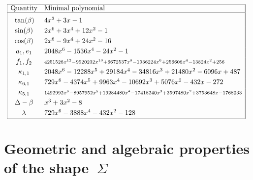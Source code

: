 \documentclass[11pt]{article}
\begin{document}
\begin{table}
$$
\!\!\!
\begin{array}{|cl|}
\hline
\textrm{Quantity} & \textrm{Minimal polynomial} \\
\hline
\vphantom{1^{1^{1^{1^1}}}}
\tan(\beta) & 4x^3+3x-1
\\[3pt]
\sin(\beta) & 2 x^6+3 x^4+12 x^2-1
\\[3pt]
\cos(\beta) & 2 x^6-9 x^4+24 x^2-16 
\\[3pt]
a_1, e_1 & 2048 x^6-1536 x^4-24 x^2-1
\\[3pt]
f_1, f_2 & 
{\scriptstyle 4251528 x^{12}-9920232 x^{10}+6672537 x^8-1936224 x^6+256608 x^4-13824 x^2+256}
\\[3pt]
\kappa_{1,1} & 2048 x^6-12288 x^5+29184 x^4-34816 x^3+21480 x^2-6096 x+487
\\[3pt]
\kappa_{6,1} & 729 x^6-4374 x^5+9963 x^4-10692 x^3+5076 x^2-432 x-272
\\[3pt]
\kappa_{5,1} & 
{\scriptstyle 
1492992 x^6-8957952 x^5+19284480 x^4-17418240 x^3+3597480 x^2+3753648 x-1768033
}
\\[3pt]
\Delta-\beta & x^3+3 x^2-8
\\[3pt]
\lambda & 729 x^6-3888 x^4-432 x^2-128
\\[2pt]
\hline
\end{array}
$$
\caption{The minimal polynomials of some of the algebraic numbers associated with the shape $\Sigma$.}
\label{table:minpolys}
\end{table}


\newpage

\section{Geometric and algebraic properties of the shape~$\Sigma$}

\label{sec:geom-alg-properties}
\end{document}
